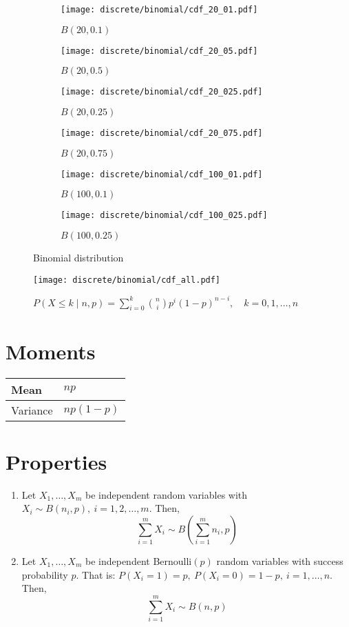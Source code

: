 \begin{figure}[H]
	\centering
	\begin{subfigure}[b]{0.45\textwidth}
		\texttt{[image: discrete/binomial/cdf\_20\_01.pdf]}
		\caption{$B(20, 0.1)$}
	\end{subfigure}
	\begin{subfigure}[b]{0.45\textwidth}
		\texttt{[image: discrete/binomial/cdf\_20\_05.pdf]}
		\caption{$B(20, 0.5)$}
	\end{subfigure}
	\begin{subfigure}[b]{0.45\textwidth}
		\texttt{[image: discrete/binomial/cdf\_20\_025.pdf]}
		\caption{$B(20, 0.25)$}
	\end{subfigure}
	\begin{subfigure}[b]{0.45\textwidth}
		\texttt{[image: discrete/binomial/cdf\_20\_075.pdf]}
		\caption{$B(20, 0.75)$}
	\end{subfigure}
	\begin{subfigure}[b]{0.45\textwidth}
		\texttt{[image: discrete/binomial/cdf\_100\_01.pdf]}
		\caption{$B(100, 0.1)$}
	\end{subfigure}
	\begin{subfigure}[b]{0.45\textwidth}
		\texttt{[image: discrete/binomial/cdf\_100\_025.pdf]}
		\caption{$B(100, 0.25)$}
	\end{subfigure}
	\caption{Binomial distribution}
\end{figure}

\begin{figure}[H]
	\texttt{[image: discrete/binomial/cdf\_all.pdf]}
	\caption{$P(X \leq k \mid n, p) = \sum_{i = 0}^{k} \binom{n}{i}p^{i}(1 - p)^{n - i}, \quad k = 0, 1, \ldots, n$}
\end{figure}

\section{Moments}

\begin{tabularx}{\textwidth}{s X}
	\hline
	Mean & $np$ \\\hline
	Variance & $np(1 - p)$\\\hline
\end{tabularx}

\section{Properties}
\begin{enumerate}
	\item Let $X_1, \ldots, X_m$ be independent random variables with $X_i \sim B(n_i, p), \ i = 1, 2, \ldots, m$. Then,
	\[
	\sum_{i = 1}^m X_i \sim B\left(\sum_{i = 1}^m n_i, p\right)
	\]
	\item Let $X_1, \ldots, X_m$ be independent Bernoulli$(p)$ random variables with success probability $p$. That is: $P(X_i = 1) = p, \ P(X_i = 0) = 1 - p, \ i = 1, \ldots, n$. Then,
	\[
	\sum_{i = 1}^m X_i \sim B\left(n, p\right)
	\]
\end{enumerate}

